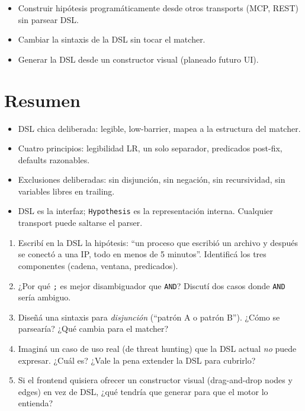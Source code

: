 \begin{itemize}
    \item Construir hipótesis programáticamente desde otros
    transports (MCP, REST) sin parsear DSL.
    \item Cambiar la sintaxis de la DSL sin tocar el matcher.
    \item Generar la DSL desde un constructor visual (planeado
    futuro UI).
\end{itemize}

\section{Resumen}

\begin{itemize}
    \item DSL chica deliberada: legible, low-barrier, mapea a la
    estructura del matcher.
    \item Cuatro principios: legibilidad LR, un solo separador,
    predicados post-fix, defaults razonables.
    \item Exclusiones deliberadas: sin disjunción, sin negación,
    sin recursividad, sin variables libres en trailing.
    \item DSL es la interfaz; \texttt{Hypothesis} es la
    representación interna. Cualquier transport puede saltarse el
    parser.
\end{itemize}

\begin{ejercicios}
\begin{enumerate}
    \item \starred{} Escribí en la DSL la hipótesis: ``un proceso
    que escribió un archivo y después se conectó a una IP, todo
    en menos de 5 minutos''. Identificá los tres componentes
    (cadena, ventana, predicados).

    \item ¿Por qué \texttt{;} es mejor disambiguador que
    \texttt{AND}? Discutí dos casos donde \texttt{AND} sería
    ambiguo.

    \item \starred{} Diseñá una sintaxis para
    \emph{disjunción} (``patrón A o patrón B''). ¿Cómo se
    parsearía? ¿Qué cambia para el matcher?

    \item Imaginá un caso de uso real (de threat hunting) que la
    DSL actual \emph{no} puede expresar. ¿Cuál es? ¿Vale la pena
    extender la DSL para cubrirlo?

    \item Si el frontend quisiera ofrecer un constructor visual
    (drag-and-drop nodes y edges) en vez de DSL, ¿qué tendría que
    generar para que el motor lo entienda?
\end{enumerate}
\end{ejercicios}
